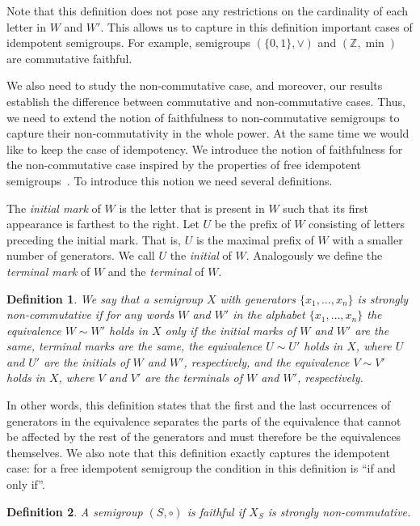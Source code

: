 \documentclass[11pt,letterpaper]{article}
\newtheorem{definition}{Definition}
\begin{document}
Note that this definition does not pose any restrictions on the cardinality of
each letter in $W$ and $W'$. This allows us to capture in this definition
important cases of idempotent semigroups. For example, semigroups
$(\{0,1\}, \vee)$ and $(\mathbb{Z},\min)$ are commutative faithful.

We also need to study the non-commutative case, and moreover, our results
establish the difference between commutative and non-commutative cases. Thus,
we need to extend the notion of faithfulness to non-commutative semigroups to
capture their non-commutativity in the whole power. At the same time we would
like to keep the case of idempotency. We introduce the notion of faithfulness
for the non-commutative case inspired by the properties of free idempotent
semigroups~\cite{GreenR52}. To introduce this notion we need several
definitions.

The \emph{initial mark} of $W$ is the letter that is present in $W$ such that
its first appearance is farthest to the right. Let $U$ be the prefix of $W$
consisting of letters preceding the initial mark. That is, $U$ is the maximal
prefix of $W$ with a smaller number of generators. We call $U$ the
\emph{initial} of $W$. Analogously we define the \emph{terminal mark} of $W$ and
the \emph{terminal} of $W$.

\begin{definition}\label{def:strong_non_commutativity}
We say that a semigroup $X$ with generators $\{x_1,\ldots, x_n\}$ is
\emph{strongly non-commutative} if for any words $W$ and $W'$ in the
alphabet $\{x_1,\ldots, x_n\}$ the equivalence $W\sim W'$ holds in $X$ only if
the initial marks of $W$ and $W'$ are the same, terminal marks are the same,
the equivalence $U \sim U'$ holds in $X$, where $U$ and $U'$ are the initials of
$W$ and $W'$, respectively, and the equivalence $V \sim V'$ holds in $X$, where
$V$ and $V'$ are the terminals of $W$ and $W'$, respectively.
\end{definition}

In other words, this definition states that the first and the last occurrences
of generators in the equivalence separates the parts of the equivalence that
cannot be affected by the rest of the generators and must therefore be the
equivalences themselves. We also note that this definition exactly captures the
idempotent case: for a free idempotent semigroup the condition in this
definition is ``if and only if''\cite{GreenR52}.

\begin{definition} \label{def:faithful}
A semigroup $(S, \circ)$ is \emph{faithful} if $X_S$ is strongly non-commutative.
\end{definition}
\end{document}
